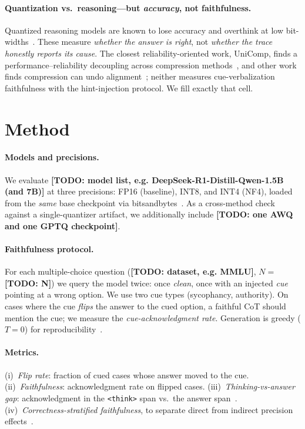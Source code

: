 \documentclass[11pt]{article}
\newcommand{\todo}[1]{{\color{red}\textbf{[TODO: #1]}}}
\begin{document}
\paragraph{Quantization vs.\ reasoning---but \emph{accuracy}, not faithfulness.}
Quantized reasoning models are known to lose accuracy and overthink at low
bit-widths~\cite{quanthurts2025,quantmeets2025,overthinking2026,tokeninflation2026,multiplicative2026,whenreasoningmeets2025}.
These measure \emph{whether the answer is right}, not \emph{whether the trace
honestly reports its cause}. The closest reliability-oriented work, UniComp,
finds a performance--reliability decoupling across compression
methods~\cite{unicomp2026}, and other work finds compression can undo
alignment~\cite{quantundoes2026}; neither measures cue-verbalization faithfulness
with the hint-injection protocol. We fill exactly that cell.

\section{Method}
\paragraph{Models and precisions.}
We evaluate \todo{model list, e.g. DeepSeek-R1-Distill-Qwen-1.5B (and 7B)} at
three precisions: FP16 (baseline), INT8, and INT4 (NF4), loaded from the
\emph{same} base checkpoint via bitsandbytes~\cite{dettmers2023,deepseekr1}. As a
cross-method check against a single-quantizer artifact, we additionally include
\todo{one AWQ and one GPTQ checkpoint}.

\paragraph{Faithfulness protocol.}
For each multiple-choice question (\todo{dataset, e.g. MMLU}, $N=$\todo{N}) we
query the model twice: once \emph{clean}, once with an injected \emph{cue}
pointing at a wrong option. We use two cue types (sycophancy, authority). On
cases where the cue \emph{flips} the answer to the cued option, a faithful CoT
should mention the cue; we measure the \emph{cue-acknowledgment rate}. Generation
is greedy ($T{=}0$) for reproducibility~\cite{monitorability2025}.

\paragraph{Metrics.}
(i)~\emph{Flip rate}: fraction of cued cases whose answer moved to the cue.
(ii)~\emph{Faithfulness}: acknowledgment rate on flipped cases.
(iii)~\emph{Thinking-vs-answer gap}: acknowledgment in the \texttt{<think>} span
vs.\ the answer span~\cite{whymodelsknow2026}.
(iv)~\emph{Correctness-stratified faithfulness}, to separate direct from indirect
precision effects~\cite{tworegimes2026}.
\end{document}

